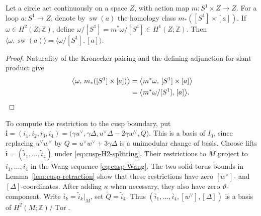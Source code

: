 \medskip
\begin{lemma}\label{lem:sweeping-slant}
Let a circle act continuously on a space $Z$, with action map
$m:S^1\times Z\to Z$.  For a loop $a:S^1\to Z$, denote by
$\operatorname{sw}(a)$ the homology class
$m_*([S^1]\times[a])$.  If $\omega\in H^2(Z;\mathbb Z)$, define
$\omega/[S^1]=m^*\omega/[S^1]\in H^1(Z;\mathbb Z)$.  Then
$\langle\omega,\operatorname{sw}(a)\rangle
=\langle\omega/[S^1],[a]\rangle$.
\end{lemma}

\begin{proof}
Naturality of the Kronecker pairing and the defining adjunction for slant
product give
\[
 \begin{aligned}
 \bigl\langle\omega,\,
   m_*([S^1]\times[a])\bigr\rangle
 &=\bigl\langle m^*\omega,\,[S^1]\times[a]\bigr\rangle\\
 &=\bigl\langle m^*\omega/[S^1],\,[a]\bigr\rangle .
 \end{aligned}\qedhere
\]
\end{proof}

To compute the restriction to the cusp boundary, put
$\mathbf i=(i_1,i_2,i_3,i_4)
=\bigl(\gamma u^\vee,\gamma\Delta,
u^\vee\Delta-2\gamma w^\vee,Q\bigr)$.
This is a basis of $I_0$, since replacing $u^\vee w^\vee$ by
$Q=u^\vee w^\vee+3\gamma\Delta$ is a unimodular change of basis.
Choose lifts
$\widetilde{\mathbf i}=(\widetilde i_1,\ldots,\widetilde i_4)$ under
\eqref{eq:cusp-H2-splitting}.  Their restrictions to $M$ project to
$i_1,\ldots,i_4$ in the Wang sequence \eqref{eq:cusp-Wang}.  The two
solid-torus bounds in Lemma~\ref{lem:cusp-retraction} show that these
restrictions have zero $[w^\vee]$- and $[\Delta]$-coordinates.  After
adding $\kappa$ when necessary, they also have zero
$\vartheta$-component.  Write
$\bar i_k=\widetilde i_k|_M$, set
$\widetilde Q=\widetilde i_4$.  Thus
$(\bar i_1,\ldots,\bar i_4,[w^\vee],[\Delta])$ is a basis of
$H^2(M;\mathbb Z)/\operatorname{Tor}$.

